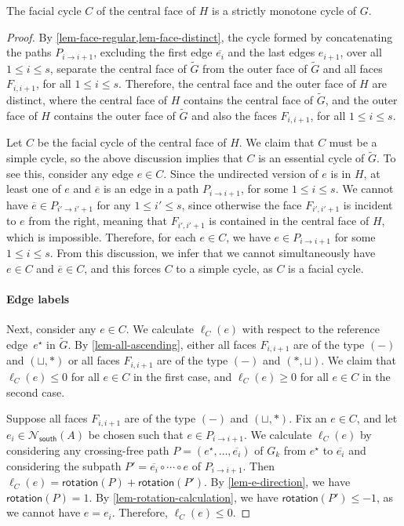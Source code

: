 \documentclass{theoretics}
\newcommand{\Nsouth}{\mathcal{N}_\mathsf{south}}
\newcommand{\rotation}{\mathsf{rotation}}
\newcommand{\eref}{e^\star}
\begin{document}
\begin{lemma}\label{lem-central-face}
The facial cycle $C$ of the central face of $H$ is a strictly monotone cycle of $G$.
\end{lemma}
\begin{proof}
By \cref{lem-face-regular,lem-face-distinct}, the cycle formed by concatenating the paths $P_{i \rightarrow i+1}$, excluding the first edge $\overline{e_i}$ and the last edges $e_{i+1}$, over all $1 \leq i \leq s$, separate the central face of $\tilde{G}$ from the outer face of $\tilde{G}$ and all faces $F_{i,i+1}$, for all $1 \leq i \leq s$.
Therefore, the central face and the outer face of $H$ are distinct, where the central face of $H$ contains the central face of $\tilde{G}$, and the outer face of $H$ contains the outer face of $\tilde{G}$ and also the faces $F_{i,i+1}$, for all $1 \leq i \leq s$. 

Let $C$ be the facial cycle of the central face of $H$.  We claim that $C$ must be a simple cycle, so the above discussion implies that $C$ is an essential cycle of $\tilde{G}$. To see this, consider any edge $e \in C$. Since the undirected version of $e$ is in $H$, at least one of $e$ and $\overline{e}$ is an edge in a path $P_{i \rightarrow i+1}$, for some $1 \leq i \leq s$.
We cannot have $\overline{e} \in P_{i' \rightarrow i'+1}$ for any $1 \leq i' \leq s$, since otherwise the face $F_{i',i'+1}$ is incident to $e$ from the right, meaning that $F_{i',i'+1}$ is contained in the central face of $H$, which is impossible. Therefore, for each $e \in C$, we have $e \in P_{i \rightarrow i+1}$ for some $1 \leq i \leq s$. From this discussion, we infer that we cannot simultaneously have $e \in C$ and $\overline{e} \in C$, and this forces $C$ to a simple cycle, as $C$ is a facial cycle. 

\paragraph{Edge labels}
Next, consider any $e \in C$. We calculate $\ell_C(e)$ with respect to the reference edge~$\eref$ in $\tilde{G}$.
By \cref{lem-all-ascending}, either all faces $F_{i,i+1}$ are of the type $(-)$ and $(\sqcup,\ast)$ or all faces $F_{i,i+1}$ are of the type $(-)$ and $(\ast,\sqcup)$. We claim that $\ell_C(e) \leq 0$ for all $e \in C$ in the first case, and $\ell_C(e) \geq 0$ for all $e \in C$ in the second case. 

Suppose all faces $F_{i,i+1}$ are of the type $(-)$ and $(\sqcup,\ast)$.
Fix an $e \in C$, and let $e_i \in \Nsouth(A)$ be chosen such that $e \in P_{i \rightarrow i+1}$. 
We calculate $\ell_C(e)$ by considering any crossing-free path $P=(\eref, \ldots, \overline{e_i})$ of $G_k$ from $\eref$ to $\overline{e_i}$ and considering the subpath $P'=\overline{e_i} \circ \cdots \circ e$ of $P_{i \rightarrow i+1}$. Then $\ell_C(e) = \rotation(P) + \rotation(P')$. By \cref{lem-e-direction}, we have $\rotation(P)=1$. By \cref{lem-rotation-calculation}, we have $\rotation(P') \leq -1$, as we cannot have $e = e_i$.
Therefore, $\ell_C(e) \leq 0$.


\end{proof}
\end{document}
